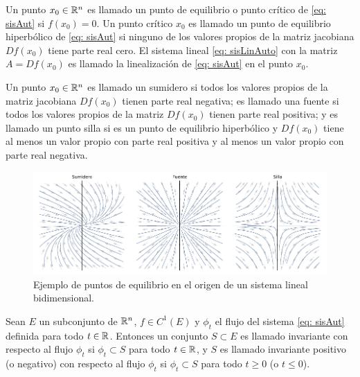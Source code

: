 \begin{defi}
	Un punto $x_{0} \in {\mathbb{R}}^{n}$ es llamado un punto de equilibrio o punto crítico de \eqref{eq: sisAut} si $f(x_{0})=0$. Un punto crítico $x_{0}$ es llamado un punto de equilibrio hiperbólico de \eqref{eq: sisAut} si ninguno de los valores propios de la matriz jacobiana $Df(x_{0})$ tiene parte real cero. El sistema lineal \eqref{eq: sisLinAuto} con la matriz $A = Df(x_{0})$ es llamado la linealización de \eqref{eq: sisAut} en el punto $x_{0}$.
\end{defi}

\begin{defi}
	Un punto $x_{0} \in {\mathbb{R}}^{n}$ es llamado un sumidero si todos los valores propios de la matriz jacobiana $Df(x_{0})$ tienen parte real negativa; es llamado una fuente si todos los valores propios de la matriz $Df(x_{0})$ tienen parte real positiva; y es llamado un punto silla si es un punto de equilibrio hiperbólico y $Df(x_{0})$ tiene al menos un valor propio con parte real positiva y al menos un valor propio con parte real negativa.
\end{defi}

\begin{figure}
	\centering
	\includegraphics[width=1\textwidth]{img/EquilibriumPoints.pdf}
	\caption{Ejemplo de puntos de equilibrio en el origen de un sistema lineal bidimensional.}
	\label{fig: EquilibriumPoints}
\end{figure}

\begin{defi}
	Sean $E$ un subconjunto de ${\mathbb{R}}^{n}$, $f \in C^{1}(E)$ y $\phi_{t}$ el flujo del sistema \eqref{eq: sisAut} definida para todo $t \in {\mathbb{R}}$. Entonces un conjunto $S \subset E$ es llamado invariante con respecto al flujo $\phi_{t}$ si $\phi_{t} \subset S$ para todo $t\in {\mathbb{R}}$, y $S$ es llamado invariante positivo (o negativo) con respecto al flujo $\phi_{t}$ si $\phi_{t} \subset S$ para todo $t \geq 0$ (o $t\leq0$).
\end{defi}

